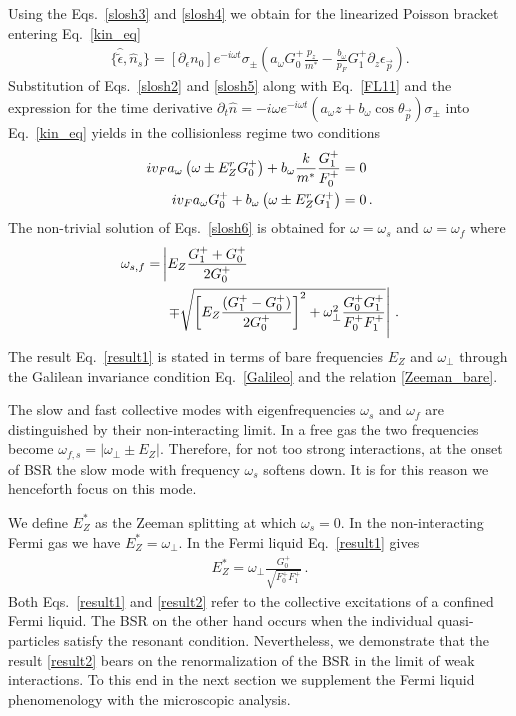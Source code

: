 Using the Eqs.~\eqref{slosh3} and \eqref{slosh4} we obtain for the linearized Poisson bracket entering Eq.~\eqref{kin_eq}
\begin{align}\label{slosh5}
\{\hat{\tilde{\epsilon}}, \hat{n}_s\}=
[\partial_{\epsilon} n_0] e^{- i \omega t} \sigma_{\pm}
\left(
a_{\omega}G_0^+\frac{p_z}{m^*} - \frac{b_{\omega}}{p_F}G_1^+ \partial_z \epsilon_{\vec{p}}
\right).
\end{align}
Substitution of Eqs.~\eqref{slosh2} and \eqref{slosh5} along with Eq.~\eqref{FL11} and the expression for the time derivative $ \partial_t \hat{n} =- i \omega e^{-i \omega t} ( a_{\omega} z+ b_{\omega} \cos \theta_{\vec{p}}) \sigma_{\pm}$ into Eq.~\eqref{kin_eq} yields in the collisionless regime two conditions
\begin{align}\label{slosh6}
i  v_F a_{\omega}  \left( \omega \pm E_Z^r G_0^+\right) 
+b_{\omega}  \frac{k}{m^*} \frac{G_1^+}{F_0^+} &= 0
\notag \\
i  v_F a_{\omega}  G_0^+   + b_{\omega}  \left( \omega \pm E_Z^r G_1^+ \right) 
&=0\, .
\end{align}
The non-trivial solution of Eqs.~\eqref{slosh6} is obtained for $\omega = \omega_s$ and $\omega = \omega_f$ where
\begin{align}\label{result1}
\omega_{s,f} = 
& \left\vert 
 E_Z\frac{G_1^+  + G_0^+}{2  G_0^+}
\right.
\notag \\
&\,\, \left. \mp \sqrt{ \left[E_Z \frac{ (G_1^+ - G_0^+) }{  2 G_0^+ }\right]^2+ \omega_{\perp}^2 \frac{G_0^ +G_1^ +}{F_0^ +F_1^ +} }\right\vert \, .
\end{align}
The result Eq.~\eqref{result1} is stated in terms of bare frequencies $E_Z$ and $\omega_{\perp}$ through the Galilean invariance condition Eq.~\eqref{Galileo} and the relation \eqref{Zeeman_bare}.


The slow and fast collective modes with eigenfrequencies $\omega_s$ and $\omega_f$ are distinguished by their non-interacting limit.
In a free gas the two frequencies become $\omega_{f,s} = \left\vert\omega_{\perp} \pm E_Z\right|$.
Therefore, for not too strong interactions, at the onset of BSR the slow mode with frequency $\omega_s$ softens down. 
It is for this reason we henceforth focus on this mode.

We define $E_Z^*$ as the Zeeman splitting at which $\omega_s = 0$.
In the non-interacting Fermi gas we have $E_Z^* = \omega_{\perp}$.
In the Fermi liquid Eq.~\eqref{result1} gives
\begin{align}\label{result2}
E_Z^* = \omega_{\perp} \frac{ G_0^+ }{ \sqrt{ F_0^{+} F_1^{+}}}\, .
\end{align}
Both Eqs.~\eqref{result1} and \eqref{result2} refer to the collective excitations of a confined Fermi liquid.
The BSR on the other hand occurs when the individual quasi-particles satisfy the resonant condition.
Nevertheless, we demonstrate that the result \eqref{result2} bears on the renormalization of the BSR in the limit of weak interactions.
To this end in the next section we supplement the Fermi liquid phenomenology with the microscopic analysis.


